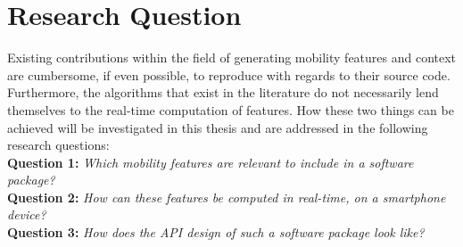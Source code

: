 \section{Research Question}

Existing contributions within the field of generating mobility features and context are cumbersome, if even possible, to reproduce with regards to their source code. Furthermore, the algorithms that exist in the literature do not necessarily lend themselves to the real-time computation of features. How these two things can be achieved will be investigated in this thesis and are addressed in the following research questions:\\

\textbf{Question 1:} \textit{Which mobility features are relevant to include in a software package?}\\

\textbf{Question 2:} \textit{How can these features be computed in real-time, on a smartphone device?}\\

\textbf{Question 3:} \textit{How does the API design of such a software package look like?}\\
